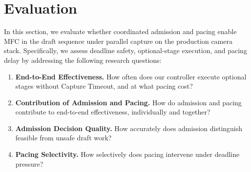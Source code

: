 \section{Evaluation}
\label{sec:evaluation}

In this section, we evaluate whether coordinated admission and pacing enable MFC in the draft sequence under parallel capture on the production camera stack.
Specifically, we assess deadline safety, optional-stage execution, and pacing delay by addressing the following research questions:

\begin{enumerate}[label=\textbf{RQ\arabic*:}, leftmargin=4.8em]
  \item \textbf{End-to-End Effectiveness.}
  How often does our controller execute optional stages without Capture Timeout, and at what pacing cost?

  \item \textbf{Contribution of Admission and Pacing.}
  How do admission and pacing contribute to end-to-end effectiveness, individually and together?

  \item \textbf{Admission Decision Quality.}
  How accurately does admission distinguish feasible from unsafe draft work?

  \item \textbf{Pacing Selectivity.}
  How selectively does pacing intervene under deadline pressure?
\end{enumerate}








